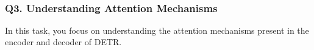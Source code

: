 \documentclass[11pt]{article}
\begin{document}
    \begin{center}
    \end{center}
    { \hspace*{\fill} \\}
    
    \subsubsection*{\texorpdfstring{\textbf{Q3. Understanding Attention
Mechanisms}}{Q3. Understanding Attention Mechanisms}}\label{q3.-understanding-attention-mechanisms}

In this task, you focus on understanding the attention mechanisms
present in the encoder and decoder of DETR.
\end{document}
